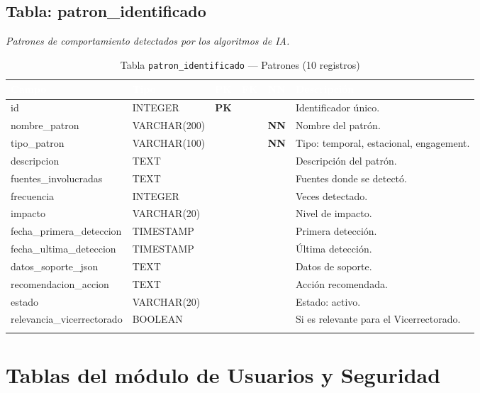 \documentclass[11pt,a4paper]{article}
\newcommand{\tableheadrow}{\rowcolor{tableheader}}
\newcommand{\tablehead}[1]{\textcolor{white}{\textbf{#1}}}
\newcommand{\pk}{\textcolor{emiblue}{\textbf{PK}}}
\newcommand{\nn}{\textcolor{red!70!black}{\textbf{NN}}}
\begin{document}
\subsection{Tabla: patron\_identificado}
\textit{Patrones de comportamiento detectados por los algoritmos de IA.}

\begin{longtable}{p{4.2cm} p{2.8cm} c c c p{4.5cm}}
\toprule
\tableheadrow
\tablehead{Campo} & \tablehead{Tipo} & \tablehead{PK} & \tablehead{FK} & \tablehead{NN} & \tablehead{Descripción} \\
\midrule
\endhead
id & INTEGER & \pk & & & Identificador único. \\
\rowcolor{tablerow}
nombre\_patron & VARCHAR(200) & & & \nn & Nombre del patrón. \\
tipo\_patron & VARCHAR(100) & & & \nn & Tipo: temporal, estacional, engagement. \\
\rowcolor{tablerow}
descripcion & TEXT & & & & Descripción del patrón. \\
fuentes\_involucradas & TEXT & & & & Fuentes donde se detectó. \\
\rowcolor{tablerow}
frecuencia & INTEGER & & & & Veces detectado. \\
impacto & VARCHAR(20) & & & & Nivel de impacto. \\
\rowcolor{tablerow}
fecha\_primera\_deteccion & TIMESTAMP & & & & Primera detección. \\
fecha\_ultima\_deteccion & TIMESTAMP & & & & Última detección. \\
\rowcolor{tablerow}
datos\_soporte\_json & TEXT & & & & Datos de soporte. \\
recomendacion\_accion & TEXT & & & & Acción recomendada. \\
\rowcolor{tablerow}
estado & VARCHAR(20) & & & & Estado: activo. \\
relevancia\_vicerrectorado & BOOLEAN & & & & Si es relevante para el Vicerrectorado. \\
\bottomrule
\caption{Tabla \texttt{patron\_identificado} — Patrones (10 registros)}
\end{longtable}

\section{Tablas del módulo de Usuarios y Seguridad}

\end{document}
